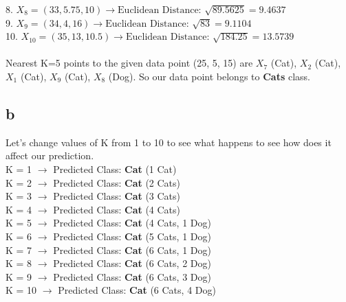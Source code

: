 \documentclass{article}
\begin{document}
8. $X_8 = (33, 5.75, 10) \rightarrow \text{Euclidean Distance: } \sqrt{89.5625} = 9.4637 $ \\

9. $X_9 = (34, 4, 16) \rightarrow \text{Euclidean Distance: } \sqrt{83} = 9.1104 $ \\

10. $X_{10} = (35, 13, 10.5) \rightarrow \text{Euclidean Distance: } \sqrt{184.25} = 13.5739 $ \\\\


Nearest K=5 points to the given data point (25, 5, 15) are $X_7$ (Cat), $X_2$ (Cat), $X_1$ (Cat), $X_9$ (Cat), $X_8$ (Dog). So our data point belongs to \textbf{Cats} class.

\pagebreak

\subsection{b}
Let's change values of K from 1 to 10 to see what happens to see how does it affect our prediction. \\

K = 1 $\rightarrow$ Predicted Class: \textbf{Cat} (1 Cat) \\

K = 2 $\rightarrow$ Predicted Class: \textbf{Cat} (2 Cats) \\

K = 3 $\rightarrow$ Predicted Class: \textbf{Cat} (3 Cats) \\

K = 4 $\rightarrow$ Predicted Class: \textbf{Cat} (4 Cats) \\

K = 5 $\rightarrow$ Predicted Class: \textbf{Cat} (4 Cats, 1 Dog) \\

K = 6 $\rightarrow$ Predicted Class: \textbf{Cat} (5 Cats, 1 Dog) \\

K = 7 $\rightarrow$ Predicted Class: \textbf{Cat} (6 Cats, 1 Dog) \\

K = 8 $\rightarrow$ Predicted Class: \textbf{Cat} (6 Cats, 2 Dog) \\

K = 9 $\rightarrow$ Predicted Class: \textbf{Cat} (6 Cats, 3 Dog) \\

K = 10 $\rightarrow$ Predicted Class: \textbf{Cat} (6 Cats, 4 Dog) \\
\end{document}
